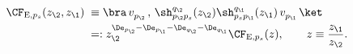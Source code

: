 \begin{equation}\begin{aligned}
\CF_{{\rm E},p_s}(z_\2,z_\1)\;\equiv\;&
\bra\, v_{p_\2}^{}\, ,\,
\sh_{p_\2p_s}^{q_\2}(z_\2)
\sh_{p_sp_\1}^{q_\1}(z_\1)\,v_{p_\1}^{}\,\ket\\
=:& \;z_\2^{\De_{p_\2}-\De_{p_\1}-\De_{q_\2}-\De_{q_\1}}
\CF_{{\rm E},p_s}(z), \qquad z\equiv\frac{z_\1}{z_\2}.
\end{aligned}\end{equation}

